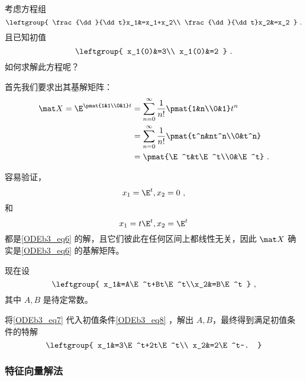 \begin{example}{}
考虑方程组
\begin{equation}\label{ODEb3_eq6}
\leftgroup{
    \frac{\dd}{\dd t}x_1&=x_1+x_2\\
    \frac{\dd}{\dd t}x_2&=x_2
}~.
\end{equation}
且已知初值
\begin{equation}\label{ODEb3_eq8}
\leftgroup{
    x_1(0)&=3\\
    x_1(0)&=2
}~.
\end{equation}
如何求解此方程呢？

首先我们要求出其基解矩阵：
\begin{equation}
\begin{aligned}
\mat X=\E^{\pmat{1&1\\0&1}t}&=\sum_{n=0}^\infty\frac{1}{n!}\pmat{1&n\\0&1}t^n\\
&=\sum_{n=0}^\infty\frac{1}{n!}\pmat{t^n&nt^n\\0&t^n}\\
&=\pmat{\E^t&t\E^t\\0&\E^t}~.
\end{aligned}
\end{equation}

容易验证，
\begin{equation}
x_1=\E^t, x_2=0~,
\end{equation}
和
\begin{equation}
x_1=t\E^t, x_2=\E^t
\end{equation}
都是\autoref{ODEb3_eq6} 的解，且它们彼此在任何区间上都线性无关，因此 $\mat X$ 确实是\autoref{ODEb3_eq6} 的基解矩阵。

现在设
\begin{equation}\label{ODEb3_eq7}
\leftgroup{
x_1&=A\E^t+Bt\E^t\\x_2&=B\E^t
}~,
\end{equation}
其中 $A, B$ 是待定常数。

将\autoref{ODEb3_eq7} 代入初值条件\autoref{ODEb3_eq8} ，解出 $A, B$，最终得到满足初值条件的特解
\begin{equation}
\leftgroup{
    x_1&=3\E^t+2t\E^t\\
    x_2&=2\E^t~.
}
\end{equation}


\end{example}

\subsubsection{特征向量解法}

